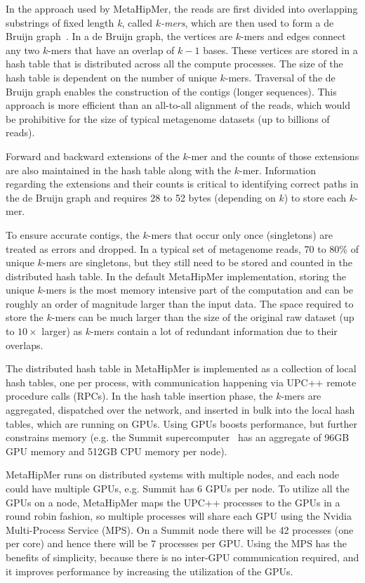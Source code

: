 In the approach used by MetaHipMer, the reads are first divided into overlapping substrings of fixed length {\it k}, called {\it $k$-mers}, which are then used to form a de Bruijn graph~\cite{CompeauPeTe11}. In a de Bruijn graph, the vertices are $k$-mers and edges connect any two $k$-mers that have an overlap of $k-1$ bases. These vertices are stored in a hash table that is distributed across all the compute processes.
The size of the hash table is dependent on the number of unique $k$-mers. 
Traversal of the de Bruijn graph enables the construction of the contigs (longer sequences). 
This approach is more efficient than an all-to-all alignment of the reads, which would be prohibitive for the size of typical metagenome datasets (up to billions of reads).

Forward and backward extensions of the $k$-mer and the counts of those extensions are also maintained in the hash table along with the $k$-mer. Information regarding the extensions and their counts is critical to identifying correct paths in the de Bruijn graph and requires 28 to 52 bytes (depending on  $k$) to store each $k$-mer. 

To ensure accurate contigs, the $k$-mers that occur only once (singletons) are treated as errors and dropped. In a typical set of metagenome reads, 70 to 80\% of unique $k$-mers are singletons, but they still need to be stored and counted in the distributed hash table. In the default MetaHipMer implementation, storing the unique $k$-mers is the most memory intensive part of the computation and can be roughly an order of magnitude larger than the input data. 
The space required to store the $k$-mers can be much larger than the size of the original raw dataset (up to $10\times$ larger) as $k$-mers contain a lot of redundant information due to their overlaps.

The distributed hash table in MetaHipMer is implemented as a collection of local hash tables, one per process, with communication happening via UPC++ remote procedure calls (RPCs). In the hash table insertion phase, the $k$-mers are aggregated, dispatched over the network, and inserted in bulk into the local hash tables, which are running on GPUs. Using GPUs boosts performance, but further constrains memory (e.g. the Summit supercomputer~\cite{VazhkudaiDBG18} has an aggregate of 96GB GPU memory and 512GB CPU memory per node).

MetaHipMer runs on distributed systems with multiple nodes, and each node could have multiple GPUs, e.g. Summit has 6 GPUs per node. To utilize all the GPUs on a node, MetaHipMer maps the UPC++ processes to the GPUs in a round robin fashion, so multiple processes will share each GPU using the Nvidia Multi-Process Service (MPS). On a Summit node there will be 42 processes (one per core) and hence there will be 7 processes per GPU. Using the MPS has the benefits of simplicity, because there is no inter-GPU communication required, and it improves performance by increasing the utilization of the GPUs. 

